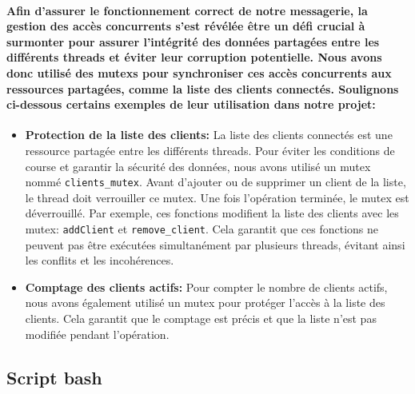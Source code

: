 \documentclass[utf8]{article}
\begin{document}
\paragraph{Afin d'assurer le fonctionnement correct de notre messagerie, la gestion des accès concurrents s'est révélée être un défi crucial à surmonter pour assurer 
l'intégrité des données partagées entre les différents threads et éviter leur corruption potentielle. Nous avons donc utilisé des mutexs pour synchroniser ces accès 
concurrents aux ressources partagées, comme la liste des clients connectés. Soulignons ci-dessous certains exemples de leur utilisation dans notre projet:}
\begin{itemize} %
    \item \textbf{Protection de la liste des clients:} La liste des clients connectés est une ressource partagée entre les différents threads. 
    Pour éviter les conditions de course et garantir la sécurité des données, nous avons utilisé un mutex nommé \texttt{clients\_mutex}. Avant d'ajouter
    ou de supprimer un client de la liste, le thread doit verrouiller ce mutex. Une fois l'opération terminée, le mutex est déverrouillé.
    Par exemple, ces fonctions modifient la liste des clients avec les mutex: \texttt{addClient} et \texttt{remove\_client}.
    Cela garantit que ces fonctions ne peuvent pas être exécutées simultanément par plusieurs threads, évitant ainsi les conflits 
    et les incohérences.
    \item \textbf{Comptage des clients actifs:} Pour compter le nombre de clients actifs, nous avons également utilisé un mutex pour protéger l'accès à la 
    liste des clients. Cela garantit que le comptage est précis et que la liste n'est pas modifiée pendant l'opération.
\end{itemize}


\subsection{Script bash}
\end{document}
